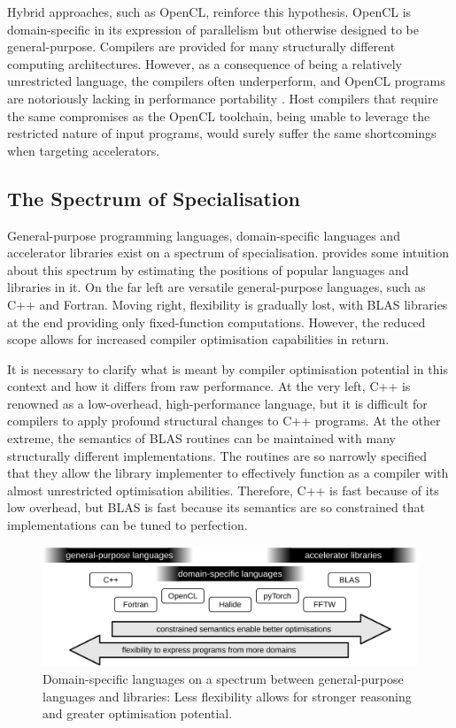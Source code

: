     Hybrid approaches, such as OpenCL, reinforce this hypothesis.
    OpenCL is domain-specific in its expression of parallelism but otherwise
    designed to be general-purpose.
    Compilers are provided for many structurally different computing
    architectures.
    However, as a consequence of being a relatively unrestricted language, the
    compilers often underperform, and OpenCL programs are notoriously lacking in
    performance portability \citep{Falch:2015:MLB:2863697.2864570}.
    Host compilers that require the same compromises as the OpenCL toolchain,
    being unable to leverage the restricted nature of input programs, would
    surely suffer the same shortcomings when targeting accelerators.

\subsection{The Spectrum of Specialisation}

    General-purpose programming languages, domain-specific languages and
    accelerator libraries exist on a spectrum of specialisation.
     provides some intuition about this spectrum by
    estimating the positions of popular languages and libraries in it.
    On the far left are versatile general-purpose languages, such as C++ and
    Fortran.
    Moving right, flexibility is gradually lost, with BLAS libraries at
    the end providing only fixed-function computations.
    However, the reduced scope allows for increased compiler optimisation
    capabilities in return.

    It is necessary to clarify what is meant by compiler optimisation potential
    in this context and how it differs from raw performance.
    At the very left, C++ is renowned as a low-overhead, high-performance
    language, but it is difficult for compilers to apply profound structural
    changes to C++ programs.
    At the other extreme, the semantics of BLAS routines can be maintained
    with many structurally different implementations.
    The routines are so narrowly specified that they allow the library
    implementer to effectively function as a compiler with almost
    unrestricted optimisation abilities.
    Therefore, C++ is fast because of its low overhead, but BLAS is fast because
    its semantics are so constrained that implementations can be tuned to
    perfection.

\begin{figure}[t]
\centering
\includegraphics[width=\textwidth]{figures/DSLgradient}
\caption{Domain-specific languages on a spectrum between general-purpose
         languages and libraries:
         Less flexibility allows for stronger reasoning and greater
         optimisation potential.}
\label{specialgradient}
\end{figure}


